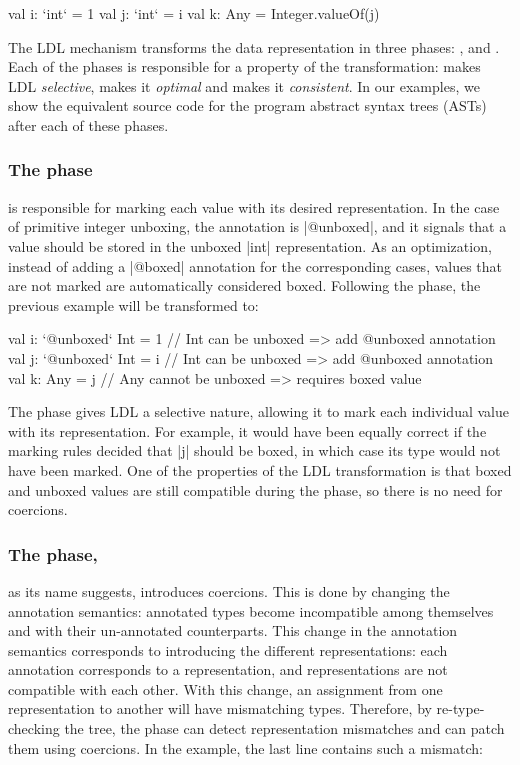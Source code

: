 \begin{lstlisting-nobreak}
val i: `int` = 1
val j: `int` = i
val k: Any = Integer.valueOf(j)
\end{lstlisting-nobreak}

The LDL mechanism transforms the data representation in three phases:
\inject{}, \coerce{} and \commit{}. Each of the phases is responsible
for a property of the transformation: \inject{} makes LDL
\emph{selective}, \coerce{} makes it \emph{optimal} and \commit{}
makes it \emph{consistent}. In our examples, we show the equivalent
source code for the program abstract syntax trees (ASTs) after each of
these phases.

\subsubsection{The \inject{} phase} is responsible for marking each value with its desired representation. In the case of primitive integer unboxing, the annotation is |@unboxed|, and it signals that a value should be stored in the unboxed |int| representation. As an optimization, instead of adding a |@boxed| annotation for the corresponding cases, values that are not marked are automatically considered boxed. Following the \inject{} phase, the previous example will be transformed to:

\begin{lstlisting-nobreak}
val i: `@unboxed` Int = 1 // Int can be unboxed => add @unboxed annotation
val j: `@unboxed` Int = i // Int can be unboxed => add @unboxed annotation
val k: Any = j                  // Any cannot be unboxed => requires boxed value
\end{lstlisting-nobreak}

The \inject{} phase gives LDL a selective nature, allowing it to mark
each individual value with its representation. For example, it would
have been equally correct if the marking rules decided that |j| should
be boxed, in which case its type would not have been marked. One of
the properties of the LDL transformation is that boxed and unboxed
values are still compatible during the \inject{} phase, so there is no
need for coercions.

\subsubsection{The \coerce{} phase,} as its name suggests, introduces coercions. This is done by changing the annotation semantics: annotated types become incompatible among themselves and with their un-annotated counterparts. This change in the annotation semantics corresponds to introducing the different representations: each annotation corresponds to a representation, and representations are not compatible with each other. With this change, an assignment from one representation to another will have mismatching types. Therefore, by re-type-checking the tree, the \coerce{} phase can detect representation mismatches and can patch them using coercions. In the example, the last line contains such a mismatch:

